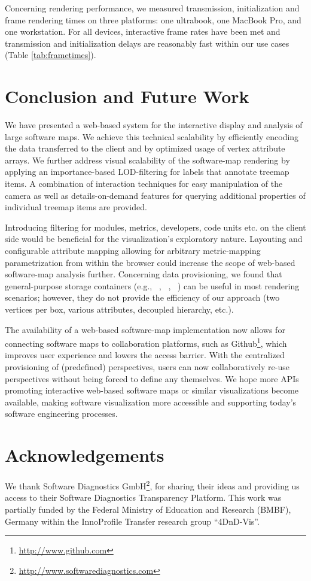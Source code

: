 \documentclass[annual]{acmsiggraph}
\newcommand{\scite}[1]{~\cite{#1}}
\begin{document}
Concerning rendering performance, we measured transmission, initialization and frame rendering times on three platforms: one ultrabook, one MacBook Pro, and one workstation.
For all devices, interactive frame rates have been met and transmission and initialization delays are reasonably fast within our use cases (Table \ref{tab:frametimes}).

\section{Conclusion and Future Work}

We have presented a web-based system for the interactive display and analysis of large software maps.
We achieve this technical scalability by efficiently encoding the data transferred to the client and by optimized usage of vertex attribute arrays.
We further address visual scalability of the software-map rendering by applying an importance-based LOD-filtering for labels that annotate treemap items.
A combination of interaction techniques for easy manipulation of the camera as well as details-on-demand features for querying additional properties of individual treemap items are provided.

Introducing filtering for modules, metrics, developers, code units etc. on the client side would be beneficial for the visualization's exploratory nature.
Layouting and configurable attribute mapping allowing for arbitrary metric-mapping parametrization from within the browser could increase the scope of web-based software-map analysis further.
Concerning data provisioning, we found that general-purpose storage containers (e.g., \scite{Behr2010}, \scite{Behr2012}, \scite{Jung2013}) can be useful in most rendering scenarios; however, they do not provide the efficiency of our approach (two vertices per box, various attributes, decoupled hierarchy, etc.).

The availability of a web-based software-map implementation now allows for connecting software maps to collaboration platforms, such as Github\footnote{\url{http://www.github.com}}, which improves user experience and lowers the access barrier.
With the centralized provisioning of (predefined) perspectives, users can now collaboratively re-use perspectives without being forced to define any themselves.
We hope more APIs promoting interactive web-based software maps or similar visualizations become available, making software visualization more accessible and supporting today's software engineering processes.

\section*{Acknowledgements}

We thank Software Diagnostics GmbH\footnote{\url{http://www.softwarediagnostics.com}}, for sharing their ideas and providing us access to their Software Diagnostics Transparency Platform.
This work was partially funded by the Federal Ministry of Education and Research (BMBF), Germany within the InnoProfile Transfer research group ``4DnD-Vis''.



\end{document}
